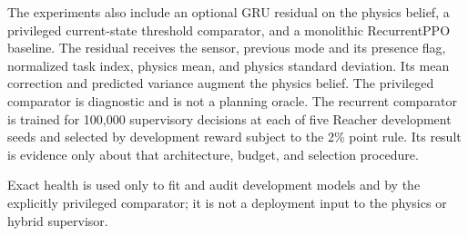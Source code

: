 The experiments also include an optional GRU residual on the physics belief, a
privileged current-state threshold comparator, and a monolithic RecurrentPPO
baseline. The residual receives the sensor, previous mode and its presence
flag, normalized task index, physics mean, and physics standard deviation. Its
mean correction and predicted variance augment the physics belief. The
privileged comparator is diagnostic and is not a planning oracle. The recurrent
comparator is trained for 100,000 supervisory decisions at each of five Reacher
development seeds and selected by development reward subject to the 2\% point
rule. Its result is evidence only about that architecture, budget, and selection
procedure.

Exact health is used only to fit and audit development models and by the
explicitly privileged comparator; it is not a deployment input to the physics
or hybrid supervisor.
